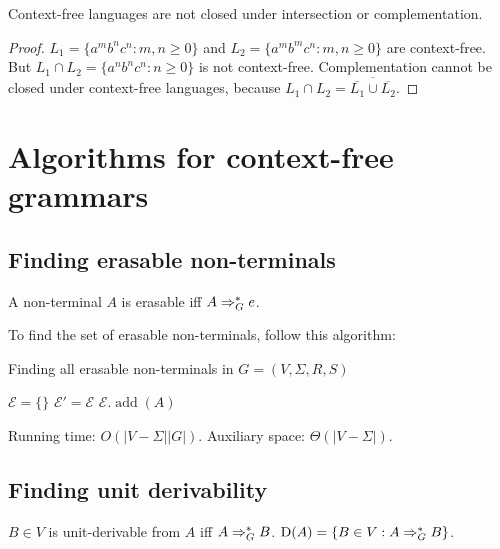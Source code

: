 \begin{theorem}
Context-free languages are not closed under intersection or complementation.
\end{theorem}
\begin{proof}
$L_1 = \{a^mb^nc^n: m, n \ge 0\}$ and $L_2 = \{a^mb^mc^n: m, n \ge 0\}$ are context-free.
But $L_1 \cap L_2 = \{a^nb^nc^n: n \ge 0\}$ is not context-free.
Complementation cannot be closed under context-free languages,
because $L_1 \cap L_2 = \overline{\overline{L_1} \cup \overline{L_2}}$.
\end{proof}

\section{Algorithms for context-free grammars}

\subsection{Finding erasable non-terminals}

\begin{definition}
A non-terminal $A$ is erasable iff $A \Rightarrow_{G}^* e$.
\end{definition}

To find the set of erasable non-terminals, follow this algorithm:

\begin{algorithm}[H]
\caption{Finding all erasable non-terminals in $G = (V, \Sigma, R, S)$}
\label{algo-erasable-non-terminals}
\begin{algorithmic}
\State $\mathcal{E} = \{\}$
\Do
    \State $\mathcal{E}' = \mathcal{E}$
            \State $\mathcal{E}.\operatorname{add}(A)$
        \EndIf
    \EndFor
{}
\end{algorithmic}
\end{algorithm}

Running time: $O(|V-\Sigma||G|)$.
Auxiliary space: $\Theta(|V-\Sigma|)$.

\subsection{Finding unit derivability}

\begin{definition}
$B \in V$ is unit-derivable from $A$ iff $A \Rightarrow_{G}^* B$.
$\operatorname{D}(A) = \{B \in V: A \Rightarrow_{G}^* B\}$.
\end{definition}


